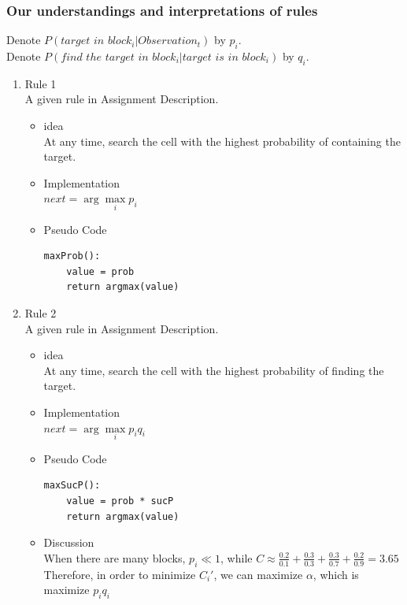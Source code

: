 \documentclass[letter]{article}
\begin{document}
\subsubsection{Our understandings and interpretations of rules}
Denote $P(target\,\, in \,\, block_i|Observation_t)$ by $p_i$. \\
Denote $P(find\,\, the\,\, target\,\, in\,\, block_i|target\,\, is\,\, in\,\, block_i)$ by $q_i$.
\begin{enumerate}
	\item {Rule 1} \\
	A given rule in Assignment Description.
	\begin{itemize}
		\item {idea} \\
		At any time, search the cell with the highest probability of containing the target.
		\item {Implementation} \\
		$next = \arg\max\limits_i p_i$
		\item {Pseudo Code} 
		\begin{lstlisting}
maxProb():
	value = prob
	return argmax(value)
		\end{lstlisting}
	\end{itemize}
	
	\item {Rule 2} \\
	A given rule in Assignment Description.
	\begin{itemize}
		\item {idea} \\
		At any time, search the cell with the highest probability of finding the target.
		\item {Implementation} \\
		$next = \arg\max\limits_i p_iq_i$
		\item {Pseudo Code} 
		\begin{lstlisting}
maxSucP():
	value = prob * sucP
	return argmax(value)   
		\end{lstlisting}
		\item {Discussion} \\
		When there are many blocks, $p_i \ll 1$, while $C \approx \frac{0.2}{0.1} + \frac{0.3}{0.3} + \frac{0.3}{0.7} + \frac{0.2}{0.9} = 3.65$ Therefore, in order to minimize $C_i'$, we can maximize $\alpha$, which is maximize $p_iq_i$
	\end{itemize}


\end{enumerate}
\end{document}
